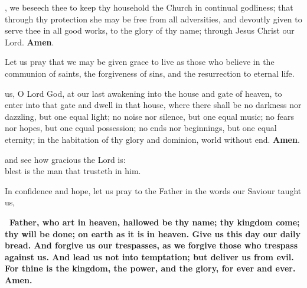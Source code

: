 , we beseech thee to keep thy household the Church in continual godliness;
that through thy protection she may be free from all adversities, and devoutly
given to serve thee in all good works, to the glory of thy name; through Jesus Christ
our Lord. \textbf{Amen}.


Let us pray that we may be given grace to live as those who believe in the communion
of saints, the forgiveness of sins, and the resurrection to eternal life.

 us, O Lord God, at our last awakening into the house and gate of heaven, to
enter into that gate and dwell in that house, where there shall be no darkness nor
dazzling, but one equal light; no noise nor silence, but one equal music; no fears nor
hopes, but one equal possession; no ends nor beginnings, but one equal eternity; in the
habitation of thy glory and dominion, world without end. \textbf{Amen}.\\
\hfill{}


\begin{center}
	
 and see how gracious the Lord is:\\
blest is the man that trusteth in him.
\end{center}






In confidence and hope, let us pray to the Father in the words our Saviour taught us,

\bfseries\ Father, who art in heaven, hallowed be thy name; thy kingdom
come; thy will be done; on earth as it is in heaven. Give us this day
our daily bread. And forgive us our trespasses, as we forgive those who
trespass against us. And lead us not into temptation; but deliver us from
evil. For thine is the kingdom, the power, and the glory, for ever and ever.\\
Amen.\normalfont



